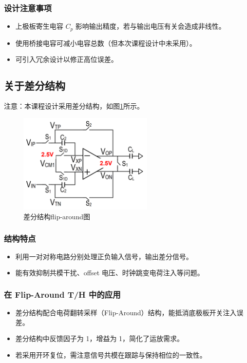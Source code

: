 \documentclass[cs4size,a4paper]{ctexart}
\numberwithin{equation}{section}
\numberwithin{table}{section}
\numberwithin{figure}{section}
\begin{document}
			\subsubsection{设计注意事项}
			\begin{itemize}
				\item 上极板寄生电容 $C_p$ 影响输出精度，若与输出电压有关会造成非线性。
				\item 使用桥接电容可减小电容总数（但本次课程设计中未采用）。
				\item 可引入冗余设计以修正高位误差。
			\end{itemize}
		
		\subsection{关于差分结构}
		注意：本课程设计采用差分结构，如图\ref{fig:diff}所示。
			\begin{figure}[H]
				\centering
				\includegraphics[width=0.6\textwidth]{figure/diff.png}
				\caption{差分结构flip-around图} \label{fig:diff}
			\end{figure}
		
		
			\subsubsection{结构特点}
			\begin{itemize}
				\item 利用一对对称电路分别处理正负输入信号，输出差分信号。
				\item 能有效抑制共模干扰、offset 电压、时钟跳变电荷注入等问题。
			\end{itemize}
			
			\subsubsection{在 Flip-Around T/H 中的应用}
			\begin{itemize}
				\item 差分结构配合电荷翻转采样（Flip-Around）结构，能抵消底极板开关注入误差。
				\item 差分结构中反馈因子为 1，增益为 1，简化了运放需求。
				\item 若采用开环复位，需注意信号共模在跟踪与保持相位的一致性。
			\end{itemize}
			
\end{document}
